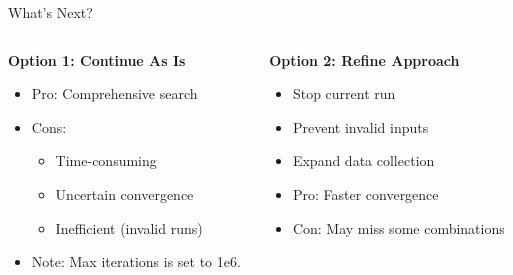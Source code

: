 \begin{frame}{What's Next?}
    \begin{columns}
        \begin{column}{0.5\textwidth}
            \textbf{Option 1: Continue As Is}
            \begin{itemize}
                \item Pro: Comprehensive search
                \item Cons:
                      \begin{itemize}
                          \item Time-consuming
                          \item Uncertain convergence
                          \item Inefficient (invalid runs)
                      \end{itemize}
                \item Note: Max iterations is set to 1e6.
            \end{itemize}
        \end{column}
        \begin{column}{0.5\textwidth}
            \textbf{Option 2: Refine Approach}
            \begin{itemize}
                \item Stop current run
                \item Prevent invalid inputs
                \item Expand data collection
                \item Pro: Faster convergence
                \item Con: May miss some combinations
            \end{itemize}
        \end{column}
    \end{columns}
\end{frame}

